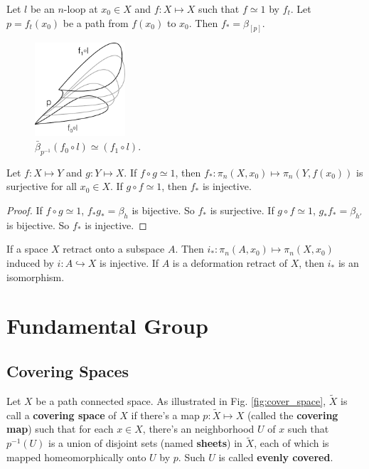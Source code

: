 \documentclass[12pt]{book}
\begin{document}
\begin{corollary}
	Let $l$ be an $n$-loop at $x_0\in X$ and $f:X\mapsto X$ such that $f\simeq 1$ by $f_t$. Let $p=f_{t}(x_0)$ be a path from $f(x_0)$ to $x_0$. Then $f_*=\beta_{[p]}$.
\end{corollary}

\begin{figure}[htb!]
	\centering  
	\includegraphics[width=0.3\textwidth ]{resources/chap_bas_cstr/induce_hom.pdf}  
	\caption{$\bar \beta _{p^{-1}} (f_0\circ l)\simeq (f_1\circ l)$.}
	\label{fig:induce_hom}
\end{figure}

\begin{lemma}
	Let $f:X\mapsto Y$ and $g:Y\mapsto X$. If $f\circ g\simeq 1$, then $f_*:\pi_n(X,x_0)\mapsto\pi_n(Y,f(x_0))$ is surjective for all $x_0\in X$. If $g\circ f\simeq 1$, then $f_*$ is injective.
\end{lemma}
\begin{proof}
	If $f\circ g\simeq 1$, $f_*g_*=\beta_h$ is bijective. So $f_*$ is surjective. If $g\circ f\simeq 1$, $g_*f_*=\beta_{h'}$ is bijective. So $f_*$ is injective.
\end{proof}

\begin{corollary}
	If a space $X$ retract onto a subspace $A$. Then $i_*:\pi_n(A,x_0)\mapsto\pi_n(X,x_0)$ induced by $i:A\hookrightarrow X$ is injective. If $A$ is a deformation retract of $X$, then $i_*$ is an isomorphism.
	
\end{corollary}

\chapter{Fundamental Group}
\section{Covering Spaces}

\begin{definition}
	Let $X$ be a path connected space. As illustrated in Fig. \ref{fig:cover_space}, $\tilde X$ is call a {\bf covering space} of $X$ if there's a map $p:\tilde X\mapsto X$ (called the {\bf covering map}) such that for each $x\in X$, there's an neighborhood $U$ of $x$ such that $p^{-1}(U)$ is a union of disjoint sets (named {\bf sheets}) in $\tilde X$, each of which is mapped homeomorphically onto $U$ by $p$. Such $U$ is called {\bf evenly covered}.
\end{definition}
\end{document}
